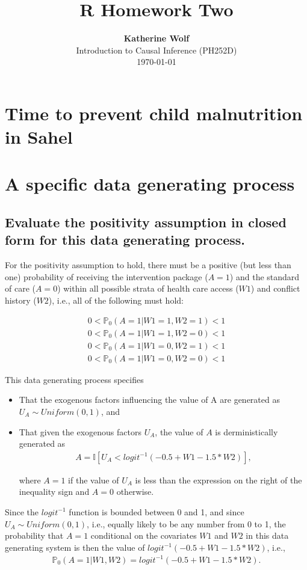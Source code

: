 \documentclass{article}\usepackage[]{graphicx}\usepackage[]{xcolor}
\title{\textbf{R Homework Two}}
\author{\textbf{Katherine Wolf}\\ Introduction to Causal Inference (PH252D)\\ \today}
\date{}
\begin{document}
\maketitle

\section{Time to prevent child malnutrition in Sahel}

\section{A specific data generating process}

  \subsection{Evaluate the positivity assumption in closed form for this data generating process.}
  
For the positivity assumption to hold, there must be a positive (but less than one) probability of receiving the intervention package ($A = 1$) and the standard of care ($A = 0$) within all possible strata of health care access ($W1$) and conflict history ($W2$), i.e., all of the following must hold:

\begin{align*}
0<\mathbb{P}_0(A=1|W1=1,W2=1)<1 \\
0<\mathbb{P}_0(A=1|W1=1,W2=0)<1 \\
0<\mathbb{P}_0(A=1|W1=0,W2=1)<1 \\
0<\mathbb{P}_0(A=1|W1=0,W2=0)<1
\end{align*}

This data generating process specifies
\begin{itemize}
\item That the exogenous factors influencing the value of A are generated as $U_A \sim Uniform(0,1)$, and 
\item That given the exogenous factors $U_A$, the value of $A$ is derministically generated as 
\begin{align*}
A=\mathbb{I}[U_A<logit^{-1}(-0.5+W1-1.5*W2)],
\end{align*}

where $A=1$ if the value of $U_A$ is less than the expression on the right of the inequality sign and $A=0$ otherwise.
\end{itemize}

Since the $logit^{-1}$ function is bounded between 0 and 1, and since $U_A \sim Uniform(0,1)$, i.e., equally likely to be any number from 0 to 1, the probability that $A=1$ conditional on the covariates $W1$ and $W2$ in this data generating system is then the value of $logit^{-1}(-0.5+W1-1.5*W2)$, i.e., 
\begin{align*}
\mathbb{P}_0(A=1|W1,W2)=logit^{-1}(-0.5+W1-1.5*W2).
\end{align*}
\end{document}
